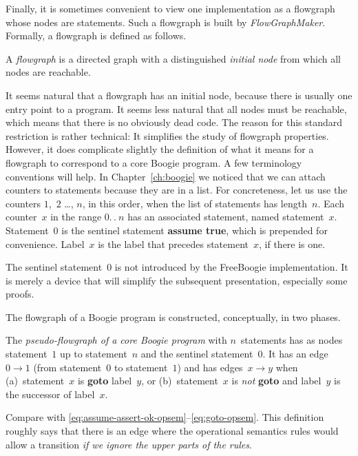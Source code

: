 \documentclass{llncs}
\begin{document}
Finally, it is sometimes convenient to view one implementation as
a flowgraph whose nodes are statements. Such a flowgraph is built
by \textit{FlowGraphMaker}. Formally, a flowgraph is defined as
follows.

\begin{definition}
A \emph{flowgraph} is a directed graph with a distinguished
\emph{initial node} from which all nodes are reachable.
\end{definition}

It seems natural that a flowgraph has an initial node, because
there is usually one entry point to a program. It seems less
natural that all nodes must be reachable, which means that
there is no obviously dead code. The reason for this standard
restriction is rather technical: It simplifies the study of
flowgraph properties. However, it does complicate slightly the
definition of what it means for a flowgraph to correspond to a
core Boogie program. A few terminology conventions will help. In
Chapter~\ref{ch:boogie} we noticed that we can attach counters
to statements because they are in a list. For concreteness, let
us use the counters $1$,~$2$ \dots, $n$, in this order, when the
list of statements has length~$n$. Each counter~$x$ in the range
$0.\,.\>n$ has an associated statement, named statement~$x$.
Statement~$0$ is the sentinel statement \textbf{assume true},
which is prepended for convenience. Label~$x$ is the label that
precedes statement~$x$, if there is one.

\begin{remark}
The sentinel statement~$0$ is not introduced by the FreeBoogie
implementation. It is merely a device that will simplify the
subsequent presentation, especially some proofs.
\end{remark}

The flowgraph of a Boogie program is constructed, conceptually,
in two phases.

\begin{definition}
The \emph{pseudo-flowgraph of a core Boogie program} with
$n$~statements has as nodes statement~$1$ up to statement~$n$
and the sentinel statement~$0$. It has an edge~$0\to1$
(from statement~$0$ to statement~$1$) and has edges~$x\to
y$ when (a)~statement~$x$ is \textbf{goto} label~$y$, or
(b)~statement~$x$ is \emph{not} \textbf{goto} and label~$y$ is
the successor of label~$x$.
\end{definition}

\begin{remark}
Compare with
\eqref{eq:assume-assert-ok-opsem}--\eqref{eq:goto-opsem}.
This definition roughly says that there is an edge where the
operational semantics rules would allow a transition \emph{if we
ignore the upper parts of the rules}.
\end{remark}
\end{document}
